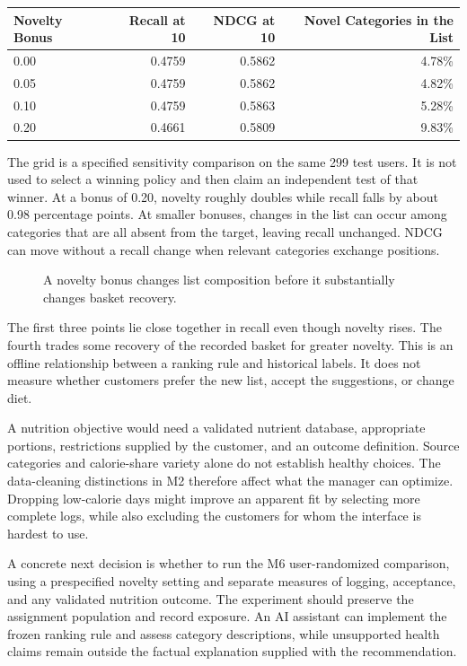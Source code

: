 \begin{table}[H]
\centering\small
\begin{tabular}{@{}lrrr@{}}
\toprule
Novelty Bonus & Recall at 10 & NDCG at 10 & Novel Categories in the
List \\
\midrule

0.00 & 0.4759 & 0.5862 & 4.78\% \\
0.05 & 0.4759 & 0.5862 & 4.82\% \\
0.10 & 0.4759 & 0.5863 & 5.28\% \\
0.20 & 0.4661 & 0.5809 & 9.83\% \\
\bottomrule
\end{tabular}
\end{table}

The grid is a specified sensitivity comparison on the same 299 test
users. It is not used to select a winning policy and then claim an
independent test of that winner. At a bonus of 0.20, novelty roughly
doubles while recall falls by about 0.98 percentage points. At smaller
bonuses, changes in the list can occur among categories that are all
absent from the target, leaving recall unchanged. NDCG can move without
a recall change when relevant categories exchange positions.

\begin{figure}[htbp]
\centering

\caption{A novelty bonus changes list composition before it substantially changes basket recovery.}\label{fig:M08_mhealth_tradeoff}
\end{figure}

The first three points lie close together in recall even though novelty
rises. The fourth trades some recovery of the recorded basket for
greater novelty. This is an offline relationship between a ranking rule
and historical labels. It does not measure whether customers prefer the
new list, accept the suggestions, or change diet.

A nutrition objective would need a validated nutrient database,
appropriate portions, restrictions supplied by the customer, and an
outcome definition. Source categories and calorie-share variety alone do
not establish healthy choices. The data-cleaning distinctions in M2
therefore affect what the manager can optimize. Dropping low-calorie
days might improve an apparent fit by selecting more complete logs,
while also excluding the customers for whom the interface is hardest to
use.

A concrete next decision is whether to run the M6 user-randomized
comparison, using a prespecified novelty setting and separate measures
of logging, acceptance, and any validated nutrition outcome. The
experiment should preserve the assignment population and record
exposure. An AI assistant can implement the frozen ranking rule and
assess category descriptions, while unsupported health claims remain
outside the factual explanation supplied with the recommendation.

